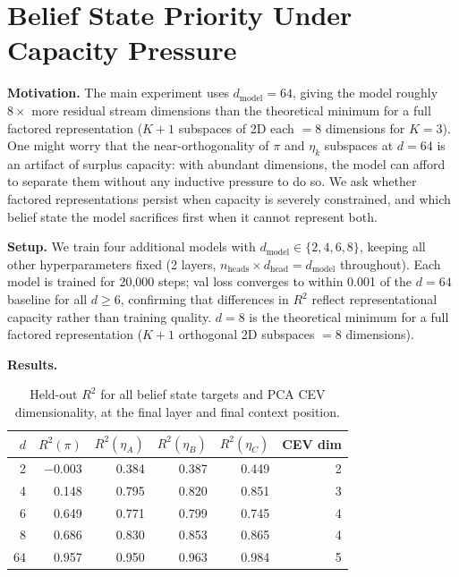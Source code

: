 \documentclass{article}
\begin{document}
\section{Belief State Priority Under Capacity Pressure}
\label{sec:dim_sweep}

\textbf{Motivation.}
The main experiment uses $d_\mathrm{model}=64$, giving the model roughly $8\times$
more residual stream dimensions than the theoretical minimum for a full factored
representation ($K+1$ subspaces of 2D each $= 8$ dimensions for $K=3$).
One might worry that the near-orthogonality of $\pi$ and $\eta_k$ subspaces at $d=64$
is an artifact of surplus capacity: with abundant dimensions, the model can afford
to separate them without any inductive pressure to do so.
We ask whether factored representations persist when capacity is severely constrained,
and which belief state the model sacrifices first when it cannot represent both.


\textbf{Setup.}
We train four additional models with $d_\mathrm{model} \in \{2, 4, 6, 8\}$,
keeping all other hyperparameters fixed (2 layers, $n_\text{heads} \times d_\text{head}
= d_\text{model}$ throughout).
Each model is trained for 20{,}000 steps; val loss converges to within 0.001 of the
$d=64$ baseline for all $d \geq 6$, confirming that differences in $R^2$ reflect
representational capacity rather than training quality.
$d=8$ is the theoretical minimum for a full factored representation
($K+1$ orthogonal 2D subspaces $= 8$ dimensions).

\textbf{Results.}

\begin{table}[h]
\centering
\begin{tabular}{rrrrrr}
\toprule
$d$ & $R^2(\pi)$ & $R^2(\eta_A)$ & $R^2(\eta_B)$ & $R^2(\eta_C)$ & CEV dim \\
\midrule
2  & $-0.003$ & 0.384 & 0.387 & 0.449 & 2 \\
4  &  0.148   & 0.795 & 0.820 & 0.851 & 3 \\
6  &  0.649   & 0.771 & 0.799 & 0.745 & 4 \\
8  &  0.686   & 0.830 & 0.853 & 0.865 & 4 \\
64 &  0.957   & 0.950 & 0.963 & 0.984 & 5 \\
\bottomrule
\end{tabular}
\caption{Held-out $R^2$ for all belief state targets and PCA CEV
dimensionality, at the final layer and final context position.}
\label{tab:dim_r2}
\end{table}
\end{document}

